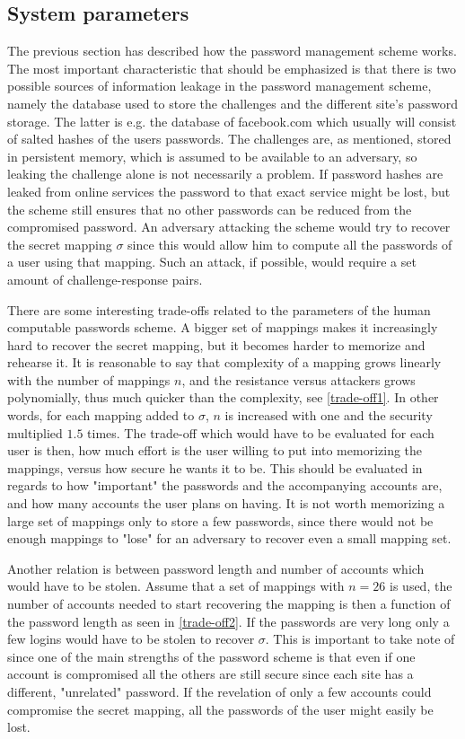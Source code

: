 \subsection{System parameters} \label{sec-params}
\par The previous section has described how the password management scheme works. The most important characteristic that should be emphasized is that there is two possible sources of information leakage in the password management scheme, namely the database used to store the challenges and the different site's password storage. The latter is e.g. the database of facebook.com which usually will consist of salted hashes of the users passwords. The challenges are, as mentioned, stored in persistent memory, which is assumed to be available to an adversary, so leaking the challenge alone is not necessarily a problem. If password hashes are leaked from online services the password to that exact service might be lost, but the scheme still ensures that no other passwords can be reduced from the compromised password. An adversary attacking the scheme would try to recover the secret mapping $\sigma$ since this would allow him to compute all the passwords of a user using that mapping. Such an attack, if possible, would require a set amount of challenge-response pairs. 
\par There are some interesting trade-offs related to the parameters of the human computable passwords scheme. A bigger set of mappings makes it increasingly hard to recover the secret mapping, but it becomes  harder to memorize and rehearse it. It is reasonable to say that complexity of a mapping grows linearly with the number of mappings $n$, and the resistance versus attackers grows polynomially, thus much quicker than the complexity, see \autoref{trade-off1}. In other words, for each mapping added to $\sigma$, $n$ is increased with one and the security multiplied $1.5$ times. The trade-off which would have to be evaluated for each user is then, how much effort is the user willing to put into memorizing the mappings, versus how secure he wants it to be. This should be evaluated in regards to how "important" the passwords and the accompanying accounts are, and how many accounts the user plans on having. It is not worth memorizing a large set of mappings only to store a few passwords, since there would not be enough mappings to "lose" for an adversary to recover even a small mapping set.
\par Another relation is between password length and number of accounts which would have to be stolen. Assume that a set of mappings with $n=26$ is used, the number of accounts needed to start recovering the mapping is then a function of the password length as seen in \autoref{trade-off2}. If the passwords are very long only a few logins would have to be stolen to recover $\sigma$. This is important to take note of since one of the main strengths of the password scheme is that even if one account is compromised all the others are still secure since each site has a different, "unrelated" password. If the revelation of only a few accounts could compromise the secret mapping, all the passwords of the user might easily be lost.
